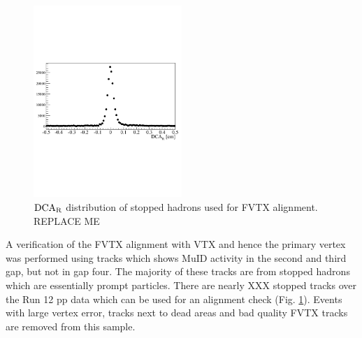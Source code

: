 \documentclass[12pt]{article}
\newcommand{\dcar}{$\rm{DCA}_{R}$ }
\begin{document}
\begin{figure}
\begin{center}
	\includegraphics[width=0.5\textwidth]{Figures/dca_hadrons}
	\caption{\label{fig:dca_hadrons}\dcar distribution of stopped hadrons used for FVTX alignment. {\color{red} REPLACE ME}}
\end{center}
\end{figure}

A verification of the FVTX alignment with VTX and hence the primary vertex was performed using tracks which shows MuID activity in the second and third gap, but 
not in gap four. The majority of these tracks are from stopped hadrons which are essentially prompt particles. There are nearly {\color{red} XXX} stopped tracks over the Run 12 pp
 data which can be used for an alignment check (Fig. \ref{fig:dca_hadrons}). Events with large vertex error, tracks next to dead areas and bad quality FVTX tracks 
 are removed from this sample.
\end{document}

